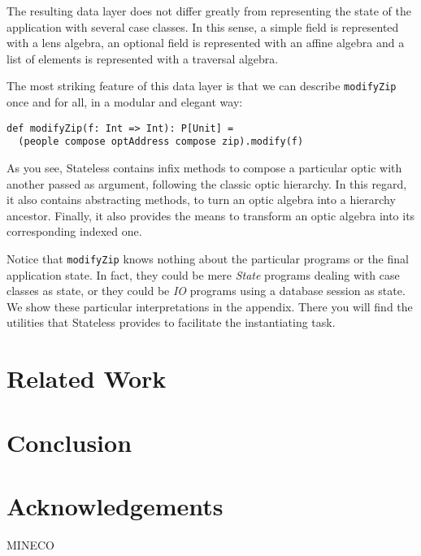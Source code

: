 \documentclass[preview, 3p]{elsarticle}
\begin{document}
The resulting data layer does not differ greatly from representing the state of
the application with several case classes. In this sense, a simple field is
represented with a lens algebra, an optional field is represented with an affine
algebra and a list of elements is represented with a traversal algebra.

The most striking feature of this data layer is that we can describe
\lstinline{modifyZip} once and for all, in a modular and elegant way:

\begin{lstlisting}
def modifyZip(f: Int => Int): P[Unit] =
  (people compose optAddress compose zip).modify(f)
\end{lstlisting}

As you see, Stateless contains infix methods to compose a particular optic with
another passed as argument, following the classic optic hierarchy. In this
regard, it also contains abstracting methods, to turn an optic algebra into a
hierarchy ancestor. Finally, it also provides the means to transform an optic
algebra into its corresponding indexed one.

Notice that \lstinline{modifyZip} knows nothing about the particular programs or
the final application state. In fact, they could be mere \emph{State} programs
dealing with case classes as state, or they could be \emph{IO} programs using a
database session as state. We show these particular interpretations in the
appendix. There you will find the utilities that Stateless provides to
facilitate the instantiating task.



\section{Related Work}
\label{sec:Discussion}

\section{Conclusion}



\section*{Acknowledgements}
MINECO

{}

\end{document}
